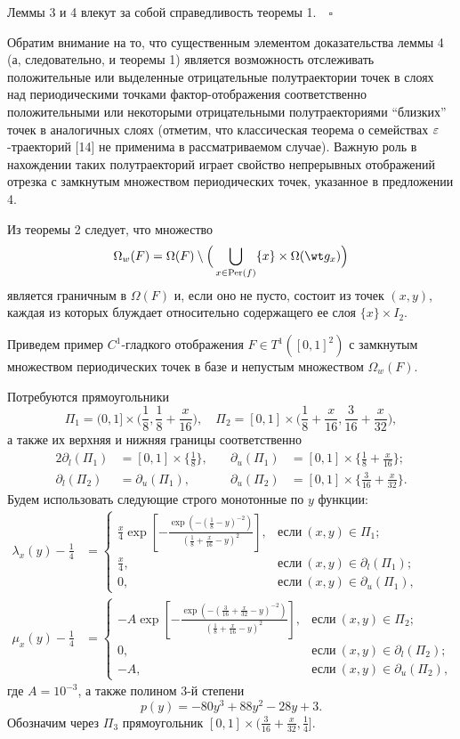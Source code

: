 Леммы 3 и 4 влекут за собой справедливость теоремы 1.$\quad\square$
\medskip


Обратим внимание на то, что существенным элементом
доказательства леммы 4 (а, следовательно,
и теоремы 1) является возможность отслеживать
положительные или выделенные отрицательные полутраектории
точек в слоях над периодическими точками
фактор-отображения соответственно положительными или
некоторыми отрицательными полутраекториями ``близких''
точек в аналогичных слоях (отметим, что классическая теорема о семействах
$\varepsilon$-траекторий [14] не применима в рассматриваемом случае).
Важную роль в нахождении таких полутраекторий играет
свойство непрерывных отображений отрезка
с замкнутым множеством периодических точек, указанное в предложении 4.

Из теоремы 2 следует, что множество
$$
\Omega_w(F)=\Omega(F)\setminus
\Big(\bigcup\limits_{x\in \Per(f)}\{x\}\times\Omega(\wt g_x)\Big)
$$
является граничным в $\Omega(F)$ и, если оно не пусто,
состоит из точек $(x, y)$, каждая из которых блуждает
относительно содержащего ее слоя $\{x\}\times I_2$.

Приведем пример $C^1$-гладкого отображения
$F\in T^1([0, 1]^2)$ с замкнутым множеством
периодических точек в базе и непустым множеством $\Omega_w(F)$.

Потребуются прямоугольники
$$
\Pi_1=(0, 1]\times \bigg(\frac{1}{8}, \frac{1}{8} + \frac{x}{16}\bigg), \quad
\Pi_2=[0, 1]\times \bigg(\frac{1}{8} +\frac{x}{16}, \frac{3}{16} +
\frac{x}{32}\bigg),
$$
а также их верхняя и нижняя границы соответственно
\begin{alignat*}{2}
\partial_l(\Pi_1)&=[0, 1]\times\bigg\{\frac{1}{8}\bigg\}, &\quad
\partial_u(\Pi_1)&=[0, 1]\times\bigg\{\frac{1}{8}+\frac{x}{16}\bigg\};\\
%
\partial_l(\Pi_2)&=\partial_u(\Pi_1), &\quad
\partial_u(\Pi_2)&=[0, 1]\times\bigg\{\frac{3}{16}+\frac{x}{32}\bigg\}.
\end{alignat*}
Будем использовать следующие строго монотонные по $y$ функции:
\begin{align*}
\lambda_x(y)-\frac14&=
\begin{cases}
\frac{x}{4}\exp \left[-\frac{ \exp (-(\frac{1}{8} -y)^{-2})}
{(\frac{1}{8} +\frac{x}{16}- y)^2}\right],
& \text{если} \ (x, y)\in\Pi_1; \\
\frac{x}{4}, & \text{если} \ (x, y)\in\partial_l(\Pi_1);\\
0, & \mbox{если} \ (x, y)\in\partial_u(\Pi_1),
\end{cases}
\\
%
\mu_x(y)-\frac14&=
\begin{cases}
-A\exp \left[-\frac{\exp (-{(\frac{3}{16}+
\frac{x}{32} -y)^{-2}})}{(\frac{1}{8} +
\frac{x}{16}- y)^2}\right], & \text{если} \ (x, y)\in\Pi_2; \\
0, & \text{если} \ (x, y)\in\partial_l(\Pi_2);\\
- A, & \text{если} \ (x, y)\in\partial_u(\Pi_2),
\end{cases}
\end{align*}
где $A=10^{-3}$, а также полином 3-й степени
$$
p(y)= -80y^3 + 88y^2 - 28y + 3.
$$
Обозначим через
$\Pi_3$ прямоугольник $[0, 1]\times (\frac{3}{16} +
\frac{x}{32}, \frac{1}{4}]$.




